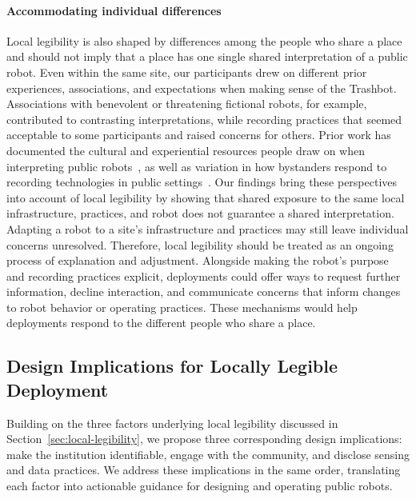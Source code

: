 \paragraph{Accommodating individual differences} 
Local legibility is also shaped by differences among the people who share a place and should not imply that a place has one single shared interpretation of a public robot. Even within the same site, our participants drew on different prior experiences, associations, and expectations when making sense of the Trashbot. Associations with benevolent or threatening fictional robots, for example, contributed to contrasting interpretations, while recording practices that seemed acceptable to some participants and raised concerns for others. Prior work has documented the cultural and experiential resources people draw on when interpreting public robots~\cite{bu2025making}, as well as variation in how bystanders respond to recording technologies in public settings~\cite{denning2014insitu}. Our findings bring these perspectives into account of local legibility by showing that shared exposure to the same local infrastructure, practices, and robot does not guarantee a shared interpretation. Adapting a robot to a site's infrastructure and practices may still leave individual concerns unresolved. Therefore, local legibility should be treated as an ongoing process of explanation and adjustment. Alongside making the robot's purpose and recording practices explicit, deployments could offer ways to request further information, decline interaction, and communicate concerns that inform changes to robot behavior or operating practices. These mechanisms would help deployments respond to the different people who share a place.

\subsection{Design Implications for Locally Legible Deployment} 
\label{sec:deployment-relationship} 
Building on the three factors underlying local legibility discussed in Section~\ref{sec:local-legibility}, we propose three corresponding design implications: make the institution identifiable, engage with the community, and disclose sensing and data practices. We address these implications in the same order, translating each factor into actionable guidance for designing and operating public robots.

